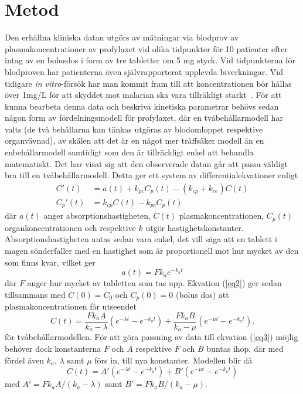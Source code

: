 \documentclass[a4paper,11pt]{article}
\begin{document}
\section{Metod}
Den erhållna kliniska datan utgörs av mätningar via blodprov av plasmakoncentrationer av profylaxet vid olika tidpunkter för 10 patienter efter intag av en bolusdos i form av tre tabletter om 5 mg styck. Vid tidpunkterna för blodproven har patienterna även självrapporterat upplevda biverkningar. Vid tidigare \emph{in vitro}-försök har man kommit fram till att koncentrationen bör hållas över 1mg/L för att skyddet mot malarian ska vara tillräkligt starkt~\cite{horisto}. För att kunna bearbeta denna data och beskriva kinetiska parametrar behövs sedan någon form av fördelningsmodell för profylaxet, där en tvåbehållarmodell har valts (de två behållarna kan tänkas utgöras av blodomloppet respektive organvävnad), av skälen att det är en något mer träffsäker modell än en enbehållarmodell samtidigt som den är tillräckligt enkel att behandla matematiskt. Det har visat sig att den observerade datan går att passa väldigt bra till en tvåbehållarmodell. Detta ger ett system av differentialekvationer enligt
\begin{align}
C'(t) & = a(t) + k_{pc}C_p(t) - (k_{cp}+k_{ce})C(t) \\
C_p '(t) & = k_{cp}C(t) - k_{pc}C_p(t)
\label{eq1}
\end{align}
där $a(t)$ anger absorptionshastigheten, $C(t)$ plasmakoncentrationen, $C_p(t)$ organkoncentrationen och respektive $k$ utgör hastighetskonstanter. Absorptionshastigheten antas sedan vara enkel, det vill säga att en tablett i magen sönderfaller med en hastighet som är proportionell mot hur mycket av den som finns kvar, vilket ger 
\begin{equation}
a(t) = F k_a e^{-k_a t}
\label{eq2}
\end{equation}
där $F$ anger hur mycket av tabletten som tas upp. Ekvation (\ref{eq2}) ger sedan tillsammans med $C(0) = C_0$ och $C_p(0) = 0$ (bolus dos) att plasmakoncentrationen får utseendet 
\begin{equation}
C(t) = \frac{Fk_a A}{k_a - \lambda}(e^{-\lambda t} - e^{-k_a t}) + \frac{Fk_a B}{k_a - \mu}(e^{-\mu t} - e^{-k_a t}).
\label{eq3}
\end{equation}
för tvåbehållarmodellen. För att göra passning av data till ekvation (\ref{eq3}) möjlig behöver dock konstanterna $F$ och $A$ respektive $F$ och $B$ buntas ihop, där med fördel även $k_a$, $\lambda$ samt $\mu$ förs in, till nya konstanter. Modellen blir då
\begin{equation}
C(t) = A'(e^{-\lambda t} - e^{-k_a t}) + B'(e^{-\mu t} - e^{-k_a t})
\label{eq4}
\end{equation}
med $A' = Fk_a A/(k_a - \lambda)$ samt $B' = Fk_a B/(k_a - \mu)$.
\end{document}
